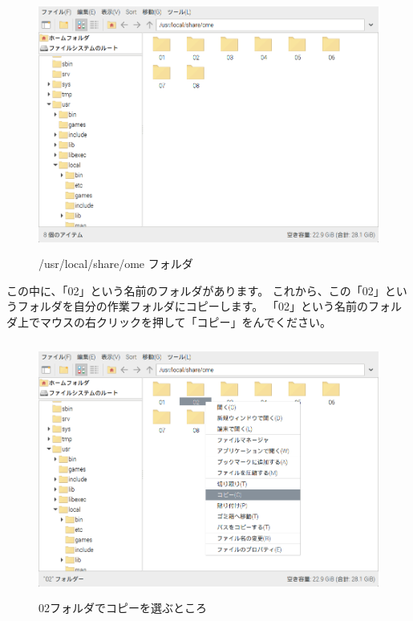 \begin{figure}[H]
  \begin{center}
    \includegraphics[keepaspectratio,width=11.232cm,height=8.424cm]{images/chap02/s_ome02a.png}
    \caption{/usr/local/share/ome フォルダ}
  \end{center}
  \label{fig:folder_ome}
\end{figure}

\noindent
この中に、「02」という名前のフォルダがあります。
これから、この「02」というフォルダを自分の作業フォルダにコピーします。
「02」という名前のフォルダ上でマウスの右クリックを押して「コピー」をんでください。

\begin{figure}[H]
  \begin{center}
    \includegraphics[keepaspectratio,width=11.232cm,height=8.424cm]{images/chap02/s_ome02b.png}
    \caption{02フォルダでコピーを選ぶところ}
  \end{center}
  \label{fig:folder_02copy}
\end{figure}


